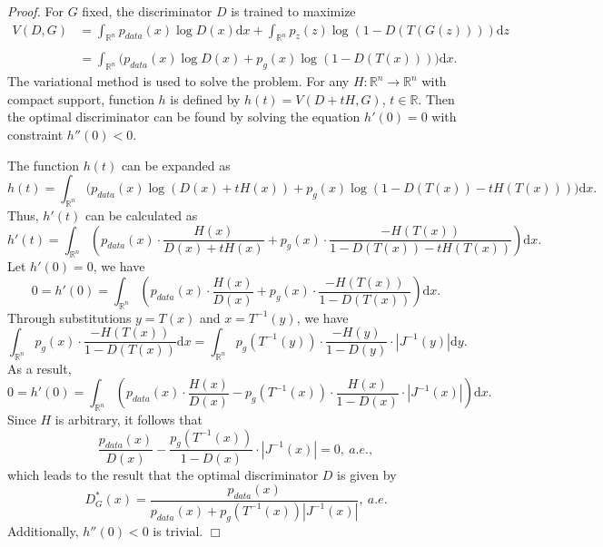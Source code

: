 \documentclass{article}
\begin{document}
\textit{Proof. } For $G$ fixed, the discriminator $D$ is trained to maximize
\begin{equation}\begin{array}{ll}
V(D,G)&=\displaystyle\int_{\mathbb{R}^n}p_{data}(x)\log D(x)\mathrm{d} x+\int_{\mathbb{R}^n}p_z(z)\log\left(1-D(T(G(z)))\right)\mathrm{d} z\\
&\\
&\displaystyle=\int_{\mathbb{R}^n}\Big(p_{data}(x)\log D(x)+p_g(x)\log\left(1-D(T(x))\right)\Big)\mathrm{d} x.
\end{array}\end{equation}
The variational method is used to solve the problem. For any $H:\mathbb{R}^n\rightarrow\mathbb{R}^n$ with compact support, function $h$ is defined by $h(t)=V(D+tH,G)$, $t\in\mathbb{R}$. Then the optimal discriminator can be found by solving the equation $h'(0)=0$ with constraint $h''(0)<0$.

The function $h(t)$ can be expanded as
\begin{equation}h(t)=\int_{\mathbb{R}^n}\Big(p_{data}(x)\log \left(D(x)+tH(x)\right)+p_g(x)\log\left(1-D(T(x))-tH(T(x))\right)\Big)\mathrm{d} x.\end{equation}
Thus, $h'(t)$ can be calculated as
\begin{equation}h'(t)=\int_{\mathbb{R}^n}\left(p_{data}(x)\cdot\frac{H(x)}{D(x)+tH(x)}+p_g(x)\cdot\frac{-H(T(x))}{1-D(T(x))-tH(T(x))}\right)\mathrm{d} x.\end{equation}
Let $h'(0)=0$, we have
\begin{equation}0=h'(0)=\int_{\mathbb{R}^n}\left(p_{data}(x)\cdot\frac{H(x)}{D(x)}+p_g(x)\cdot\frac{-H(T(x))}{1-D(T(x))}\right)\mathrm{d} x.\end{equation}
Through substitutions $y=T(x)$ and $x=T^{-1}(y)$, we have
\begin{equation}\int_{\mathbb{R}^n}p_g(x)\cdot\frac{-H(T(x))}{1-D(T(x))}\mathrm{d} x
=\int_{\mathbb{R}^n}p_g(T^{-1}(y))\cdot\frac{-H(y)}{1-D(y)}\cdot|J^{-1}(y)|\mathrm{d} y.
\end{equation}
As a result,
\begin{equation}0=h'(0)=\int_{\mathbb{R}^n}\left(p_{data}(x)\cdot\frac{H(x)}{D(x)}-p_g(T^{-1}(x))\cdot\frac{H(x)}{1-D(x)}\cdot|J^{-1}(x)|\right)\mathrm{d} x.\end{equation}
Since $H$ is arbitrary, it follows that
\begin{equation}\frac{p_{data}(x)}{D(x)}-\frac{p_g(T^{-1}(x))}{1-D(x)}\cdot|J^{-1}(x)|=0,\ a.e.,\end{equation}
which leads to the result that the optimal discriminator $D$ is given by
\begin{equation}D_G^*(x)=\frac{p_{data}(x)}{p_{data}(x)+p_g(T^{-1}(x))|J^{-1}(x)|},\ a.e.\end{equation}
Additionally, $h''(0)<0$ is trivial. $\Box$
\end{document}
